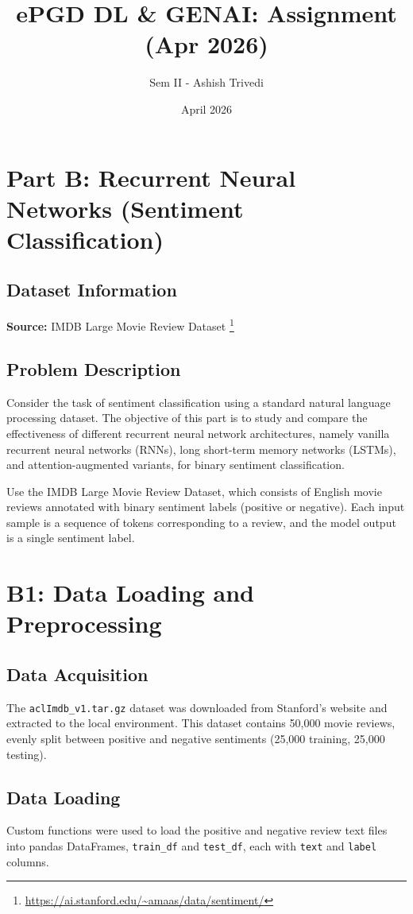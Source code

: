 \documentclass{article}
\title{ePGD DL \& GENAI: Assignment (Apr 2026)}
\author{Sem II - Ashish Trivedi}
\date{April 2026}
\begin{document}
\maketitle

\section*{Part B: Recurrent Neural Networks (Sentiment Classification)}

\subsection*{Dataset Information}
\textbf{Source:} IMDB Large Movie Review Dataset \footnote{\url{https://ai.stanford.edu/~amaas/data/sentiment/}}

\subsection*{Problem Description}
Consider the task of sentiment classification using a standard natural language processing dataset. The objective of this part is to study and compare the effectiveness of different recurrent neural network architectures, namely vanilla recurrent neural networks (RNNs), long short-term memory networks (LSTMs), and attention-augmented variants, for binary sentiment classification.

Use the IMDB Large Movie Review Dataset, which consists of English movie reviews annotated with binary sentiment labels (positive or negative). Each input sample is a sequence of tokens corresponding to a review, and the model output is a single sentiment label.

\section{B1: Data Loading and Preprocessing}

\subsection*{Data Acquisition}
The \texttt{aclImdb\_v1.tar.gz} dataset was downloaded from Stanford's website and extracted to the local environment. This dataset contains 50,000 movie reviews, evenly split between positive and negative sentiments (25,000 training, 25,000 testing).

\subsection*{Data Loading}
Custom functions were used to load the positive and negative review text files into pandas DataFrames, \texttt{train\_df} and \texttt{test\_df}, each with \texttt{text} and \texttt{label} columns.
\end{document}
